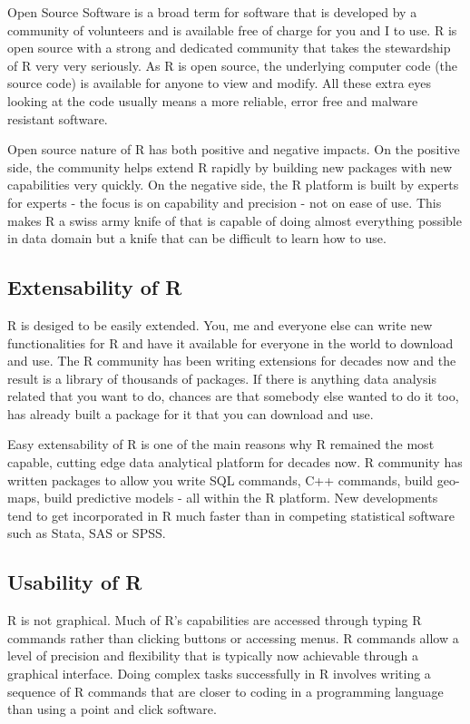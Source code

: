 \documentclass[11pt, letterpaper, twoside]{memoir}\usepackage{knitr}
\begin{document}
Open Source Software is a broad term for software that is developed by a community of volunteers and is available free of charge for you and I to use. R is open source with a strong and dedicated community that takes the stewardship of R very very seriously. 
As R is open source, the underlying computer code (the source code) is available for anyone to view and modify. All these extra eyes looking at the code usually means a more reliable, error free and malware resistant software. 

Open source nature of R has both positive and negative impacts. On the positive side, the community helps extend R rapidly by building new packages with new capabilities very quickly. On the negative side, the R platform is built by experts for experts - the focus is on capability and precision - not on ease of use. This makes R a swiss army knife of that is capable of doing almost everything possible in data domain but a knife that can be difficult to learn how to use.

\subsection{Extensability of R}

R is desiged to be easily extended. You, me and everyone else can write new functionalities for R and have it available for everyone in the world to download and use. The R community has been writing extensions for decades now and the result is a library of thousands of packages. If there is anything data analysis related that you want to do, chances are that somebody else wanted to do it too, has already built a package for it that you can download and use. 

Easy extensability of R is one of the main reasons why R remained the most capable, cutting edge data analytical platform for decades now. R community has written packages to allow you write SQL commands, C++ commands, build geo-maps, build predictive models - all within the R platform. New developments tend to get incorporated in R much faster than in competing statistical software such as Stata, SAS or SPSS.     

\subsection{Usability of R}

R is not graphical. Much of R's capabilities are accessed through typing R commands rather than clicking buttons or accessing menus. R commands allow a level of precision and flexibility that is typically now achievable through a graphical interface. Doing complex tasks successfully in R involves writing a sequence of R commands that are closer to coding in a programming language than using a point and click software.
\end{document}
